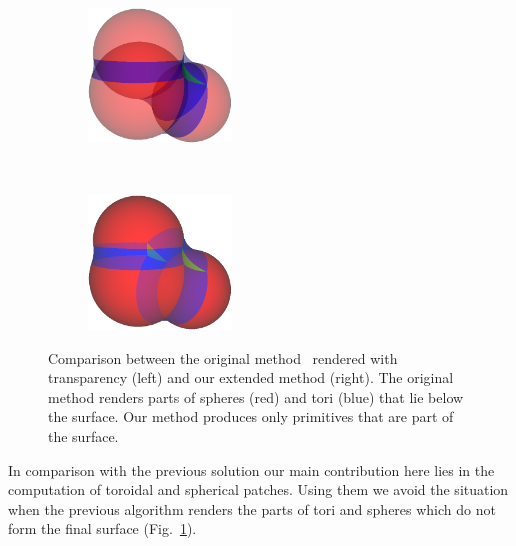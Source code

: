 \begin{figure}[htp]
  \centering
  \begin{subfigure}[t]{0.48\columnwidth}
    \centering
    \includegraphics[width=1.5in]{image/cb-krone.png}
  \end{subfigure}%
  ~
  \begin{subfigure}[t]{0.48\columnwidth}
    \centering
    \includegraphics[width=1.5in]{image/cb-oit.png}
  \end{subfigure}
	
\caption{Comparison between the original method~\cite{krone2011parallel} rendered with transparency (left) and our extended method (right).
The original method renders parts of spheres (red) and tori (blue) that lie below the surface.
Our method produces only primitives that are part of the surface.
}
\label{fig:cb-oit}
\end{figure}

In comparison with the previous solution our main contribution here lies in the computation of toroidal and spherical patches.
Using them we avoid the situation when the previous algorithm renders the parts of tori and spheres which do not form the final surface (Fig.~\ref{fig:cb-oit}).



